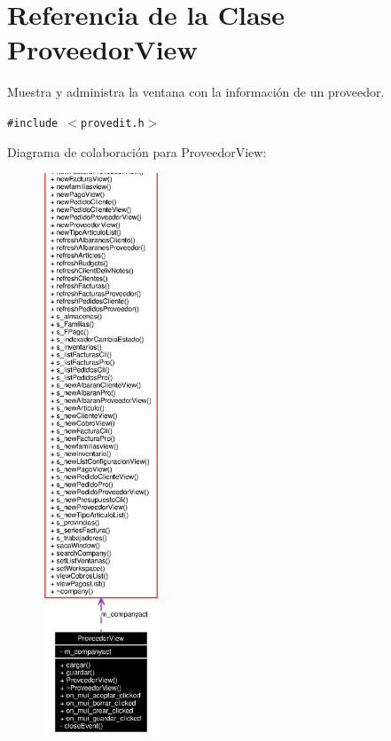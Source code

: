 \section{Referencia de la Clase Proveedor\-View}
\label{classProveedorView}
Muestra y administra la ventana con la informaci\'{o}n de un proveedor.  


{\tt \#include $<$provedit.h$>$}

Diagrama de colaboraci\'{o}n para Proveedor\-View:\begin{figure}[H]
\begin{center}
\leavevmode
\includegraphics[width=99pt]{classProveedorView__coll__graph}
\end{center}
\end{figure}
